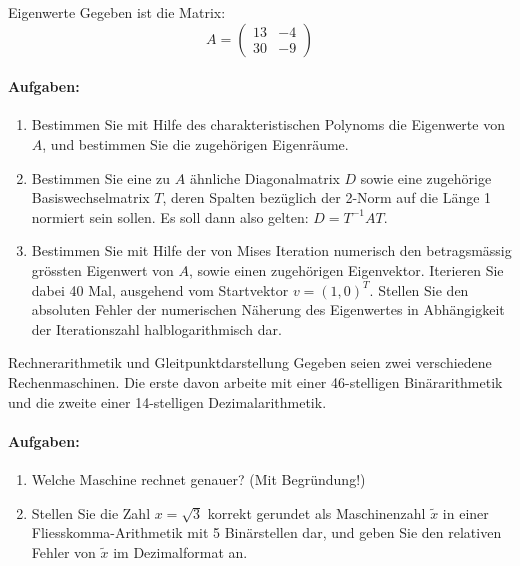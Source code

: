 \begin{example2}{Eigenwerte}
Gegeben ist die Matrix:
$$A = \begin{pmatrix}
13 & -4\\
30 & -9
\end{pmatrix}$$

\paragraph{Aufgaben:}
\begin{enumerate}
    \item Bestimmen Sie mit Hilfe des charakteristischen Polynoms die Eigenwerte von $A$, und bestimmen Sie die zugehörigen Eigenräume.
    
    \item Bestimmen Sie eine zu $A$ ähnliche Diagonalmatrix $D$ sowie eine zugehörige Basiswechselmatrix $T$, deren Spalten bezüglich der 2-Norm auf die Länge 1 normiert sein sollen. Es soll dann also gelten: $D = T^{-1}AT$.
    
    \item Bestimmen Sie mit Hilfe der von Mises Iteration numerisch den betragsmässig grössten Eigenwert von $A$, sowie einen zugehörigen Eigenvektor. Iterieren Sie dabei 40 Mal, ausgehend vom Startvektor $v = (1,0)^T$. Stellen Sie den absoluten Fehler der numerischen Näherung des Eigenwertes in Abhängigkeit der Iterationszahl halblogarithmisch dar.
\end{enumerate}
\end{example2}

\begin{example2}{Rechnerarithmetik und Gleitpunktdarstellung}
Gegeben seien zwei verschiedene Rechenmaschinen. Die erste davon arbeite mit einer 46-stelligen Binärarithmetik und die zweite einer 14-stelligen Dezimalarithmetik.

\paragraph{Aufgaben:}
\begin{enumerate}
    \item Welche Maschine rechnet genauer? (Mit Begründung!)
    \item Stellen Sie die Zahl $x = \sqrt{3}$ korrekt gerundet als Maschinenzahl $\tilde{x}$ in einer Fliesskomma-Arithmetik mit 5 Binärstellen dar, und geben Sie den relativen Fehler von $\tilde{x}$ im Dezimalformat an.
\end{enumerate}
\end{example2}


